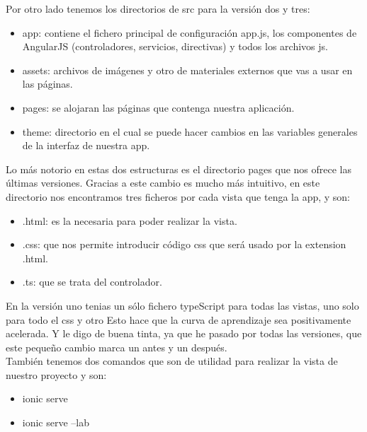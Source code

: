 \documentclass[a4paper, 11pt]{article}
\begin{document}
\begin{itemize}
            Por otro lado tenemos los directorios de src para la versión dos y tres:

            \begin{itemize}
                  \item{app: contiene el fichero principal de configuración app.js,
                        los componentes de AngularJS (controladores, servicios,
                        directivas) y todos los archivos js.}
                  \item{assets: archivos de imágenes y otro de materiales externos
                        que vas a usar en las páginas.}
                  \item{pages: se alojaran las páginas que contenga nuestra
                        aplicación.}
                  \item{theme: directorio en el cual se puede hacer cambios en las
                        variables generales de la interfaz de nuestra app.}
            \end{itemize}

            Lo más notorio en estas dos estructuras es el directorio pages que nos
            ofrece las últimas versiones. Gracias a este cambio es mucho más
            intuitivo, en este directorio nos encontramos tres ficheros por cada
            vista que tenga la app, y son:

            \begin{itemize}
                \item{.html: es la necesaria para poder realizar la vista.}
                \item{.css: que nos permite introducir código css que será usado por
                       la extension .html.}
                \item{.ts: que se trata del controlador.}
            \end{itemize}

            En la versión uno tenias un sólo fichero typeScript para todas las
            vistas, uno solo para todo el css y otro
            Esto hace que la curva de aprendizaje sea positivamente acelerada.
            Y le digo de buena tinta, ya que he pasado por todas las versiones,
            que este pequeño cambio marca un antes y un después.\\

            También tenemos dos comandos que son de utilidad para realizar la
            vista de nuestro proyecto y son:

            \begin{itemize}
                \item{ionic serve}
                \item{ionic serve --lab}
            \end{itemize}


\end{itemize}
\end{document}
